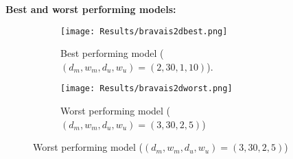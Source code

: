 \vspace*{-0.3cm}
\textbf{Best and worst performing models:}
\begin{figure}
    \centering
    \begin{subfigure}[t]{0.49\textwidth}
        \centering
        \texttt{[image: Results/bravais2dbest.png]}
        \caption{Best performing model ($(d_m,w_m,d_u,w_u)=(2, 30, 1, 10)$).}
    \end{subfigure}
    \hfill
    \begin{subfigure}[t]{0.49\textwidth}
        \centering
        \texttt{[image: Results/bravais2dworst.png]}
        \caption{Worst performing model ($(d_m,w_m,d_u,w_u)=(3, 30, 2, 5)$)}
    \end{subfigure}   
\end{figure}